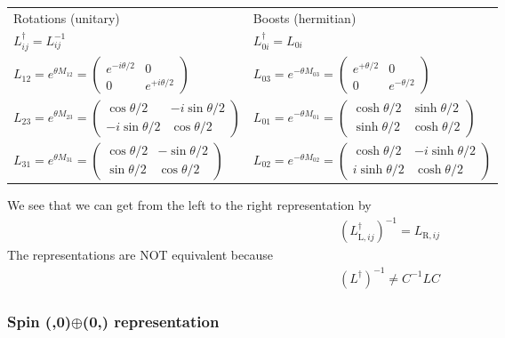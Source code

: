 \documentclass[../main.tex]{subfiles}
\begin{document}
\begin{itemize}
\begin{enumerate}
\begin{itemize}
\end{itemize}
\begin{center}
\begin{tabular}{ll}
Rotations (unitary) & Boosts (hermitian)\\
$L_{ij}^\dagger=L_{ij}^{-1}$ & $L_{0i}^\dagger=L_{0i}$\\
$L_{12}=e^{\theta M_{12}}=\left(\begin{matrix}
e^{-i\theta/2} & 0\\
0 & e^{+i\theta/2}
\end{matrix}\right)$ & $L_{03}=e^{-\theta M_{03}}=\left(\begin{matrix}
e^{+\theta/2} & 0\\
0 & e^{-\theta/2}
\end{matrix}\right)$\\
$L_{23}=e^{\theta M_{23}}=\left(\begin{matrix}
\cos\theta/2 & -i\sin\theta/2\\
-i\sin\theta/2 & \cos\theta/2
\end{matrix}\right)$ & $L_{01}=e^{-\theta M_{01}}=\left(\begin{matrix}
\cosh\theta/2 & \sinh\theta/2\\
\sinh\theta/2 & \cosh\theta/2
\end{matrix}\right)$ \\
$L_{31}=e^{\theta M_{31}}=\left(\begin{matrix}
\cos\theta/2 & -\sin\theta/2\\
\sin\theta/2 & \cos\theta/2
\end{matrix}\right)$ & $L_{02}=e^{-\theta M_{02}}=\left(\begin{matrix}
\cosh\theta/2 & -i\sinh\theta/2\\
i\sinh\theta/2 & \cosh\theta/2
\end{matrix}\right)$\\
\end{tabular}
\end{center}
\end{enumerate}
We see that we can get from the left to the right representation by
\begin{align}
(L_{\text{L},ij}^\dagger)^{-1} = L_{\text{R},ij}
\end{align}
The representations are NOT equivalent because
\begin{align}
(L^\dagger)^{-1}\neq C^{-1} L C
\end{align}

\subsubsection{Spin (,0)$\oplus$(0,) representation}


\end{itemize}
\end{document}
